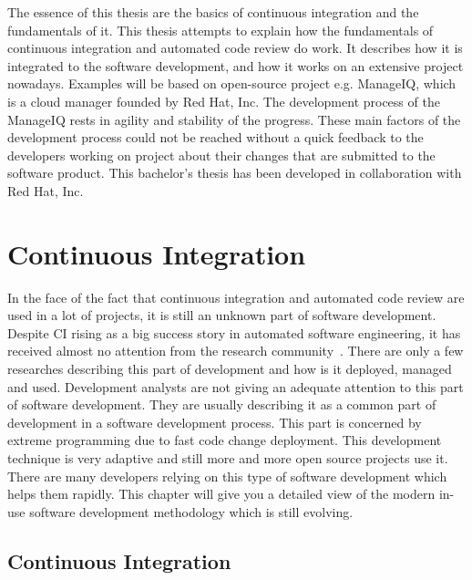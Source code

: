 The essence of this thesis are the basics of continuous integration and the fundamentals of it. This thesis attempts to explain how the fundamentals of continuous integration and automated code review do work. It describes how it is integrated to the software development, and how it works on an extensive project nowadays. Examples will be based on open-source project e.g. ManageIQ, which is a cloud manager founded by Red Hat, Inc. The development process of the ManageIQ rests in agility and stability of the progress. These main factors of the development process could not be reached without a quick feedback to the developers working on project about their changes that are submitted to the software product. This bachelor's thesis has been developed in collaboration with Red Hat, Inc.

\chapter{Continuous Integration}

In the face of the fact that continuous integration and automated code review are used in a lot of projects, it is still an unknown part of software development. Despite CI rising as a big success story in automated software engineering, it has received almost no attention from the research community~\cite{COPE}. There are only a few researches describing this part of development and how is it deployed, managed and used. Development analysts are not giving an adequate attention to this part of software development. They are usually describing it as a common part of development in a software development process. This part is concerned by extreme programming due to fast code change deployment. This development technique is very adaptive and still more and more open source projects use it. There are many developers relying on this type of software development which helps them rapidly. This chapter will give you a detailed view of the modern in-use software development methodology which is still evolving.

\section{Continuous Integration}

